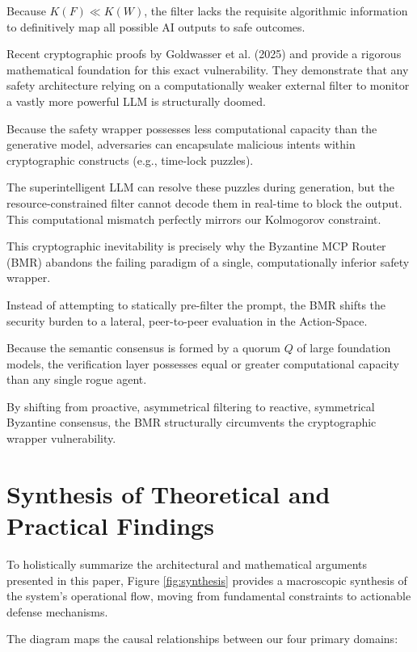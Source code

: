 \documentclass[a4paper,11pt,twocolumn]{article}
\theoremstyle{definition}
\theoremstyle{plain}
\begin{document}
Because $K(F) \ll K(W)$, the filter lacks the requisite algorithmic information to definitively map all possible AI outputs to safe outcomes. 

Recent cryptographic proofs by Goldwasser et al. (2025) \cite{goldwasser2025holes} and \cite{wang2025bypassing} provide a rigorous mathematical foundation for this exact vulnerability. They demonstrate that any safety architecture relying on a computationally weaker external filter to monitor a vastly more powerful LLM is structurally doomed.

Because the safety wrapper possesses less computational capacity than the generative model, adversaries can encapsulate malicious intents within cryptographic constructs (e.g., time-lock puzzles).

The superintelligent LLM can resolve these puzzles during generation, but the resource-constrained filter cannot decode them in real-time to block the output. This computational mismatch perfectly mirrors our Kolmogorov constraint.

\pagebreak

This cryptographic inevitability is precisely why the Byzantine MCP Router (BMR) abandons the failing paradigm of a single, computationally inferior safety wrapper.

Instead of attempting to statically pre-filter the prompt, the BMR shifts the security burden to a lateral, peer-to-peer evaluation in the Action-Space.

Because the semantic consensus is formed by a quorum $Q$ of large foundation models, the verification layer possesses equal or greater computational capacity than any single rogue agent.

By shifting from proactive, asymmetrical filtering to reactive, symmetrical Byzantine consensus, the BMR structurally circumvents the cryptographic wrapper vulnerability.

\section{Synthesis of Theoretical and Practical Findings}

To holistically summarize the architectural and mathematical arguments presented in this paper, Figure \ref{fig:synthesis} provides a macroscopic synthesis of the system's operational flow, moving from fundamental constraints to actionable defense mechanisms.

The diagram maps the causal relationships between our four primary domains:
\end{document}
